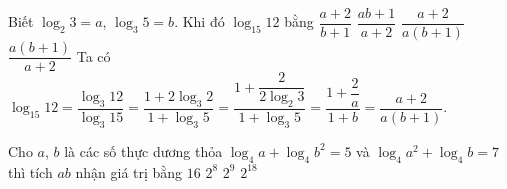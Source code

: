 \begin{ex}
	Biết $\log_2 3=a$, $\log_3 5=b$. Khi đó $\log_{15} 12$ bằng
	\choice
	{$\dfrac{a+2}{b+1}$}
	{$\dfrac{ab+1}{a+2}$}
	{\True $\dfrac{a+2}{a(b+1)}$}
	{$\dfrac{a(b+1)}{a+2}$}
	\loigiai
	{
		Ta có $\log_{15}12=\dfrac{\log_3 12}{\log_3 15}=\dfrac{1+2\log_3 2}{1+\log_3 5}=\dfrac{1+\dfrac{2}{2\log_2 3}}{1+\log_3 5}=\dfrac{1+\dfrac{2}{a}}{1+b}=\dfrac{a+2}{a(b+1)}$.
	}
\end{ex}
\begin{ex}
	Cho $a$, $b$ là các số thực dương thỏa $\log_4a+\log_4b^2=5$ và $\log_4a^2+\log_4b=7$ thì tích $ab$ nhận giá trị bằng
	\choice
	{$16$}
	{\True $2^8$}
	{$2^9$}
	{$2^{18}$}
\end{ex}

